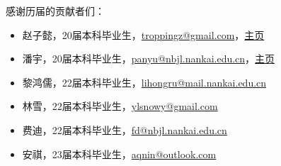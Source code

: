 \documentclass{nktba}
\begin{document}
\begin{acknowledgement}
  感谢历届的贡献者们：
  \begin{itemize}
    \item 赵子懿，20届本科毕业生，\url{troppingz@gmail.com}，\href{https://tr0py.github.io/}{主页}
    \item 潘宇，20届本科毕业生，\url{panyu@nbjl.nankai.edu.cn}，\href{https://nbjl.nankai.edu.cn/2019/0513/c19244a264683/page.htm}{主页}
    \item 黎鸿儒，22届本科毕业生，\url{lihongru@mail.nankai.edu.cn}
    \item 林雪，22届本科毕业生，\url{ylsnowy@gmail.com}
    \item 费迪，22届本科毕业生，\url{fd@nbjl.nankai.edu.cn}
    \item 安祺，23届本科毕业生，\url{aqnin@outlook.com}
  \end{itemize}
\end{acknowledgement}
\end{document}
